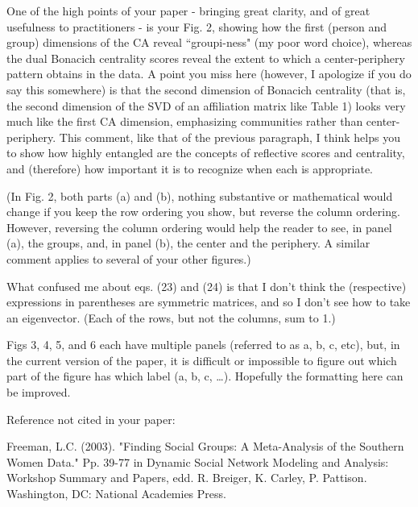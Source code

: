 \documentclass[]{letter}
\begin{document}
One of the high points of your paper - bringing great clarity, and of great usefulness to practitioners - is your Fig. 2, showing how the first (person and group) dimensions of the CA reveal ``groupi-ness" (my poor word choice), whereas the dual Bonacich centrality scores reveal the extent to which a center-periphery pattern obtains in the data. A point you miss here (however, I apologize if you do say this somewhere) is that the second dimension of Bonacich centrality (that is, the second dimension of the SVD of an affiliation matrix like Table 1) looks very much like the first CA dimension, emphasizing communities rather than center-periphery. This comment, like that of the previous paragraph, I think helps you to show how highly entangled are the concepts of reflective scores and centrality, and (therefore) how important it is to recognize when each is appropriate.

(In Fig. 2, both parts (a) and (b), nothing substantive or mathematical would change if you keep the row ordering you show, but reverse the column ordering. However, reversing the column ordering would help the reader to see, in panel (a), the groups, and, in panel (b), the center and the periphery. A similar comment applies to several of your other figures.)

What confused me about eqs. (23) and (24) is that I don't think the (respective) expressions in parentheses are symmetric matrices, and so I don't see how to take an eigenvector. (Each of the rows, but not the columns, sum to 1.)
    
Figs 3, 4, 5, and 6 each have multiple panels (referred to as a, b, c, etc), but, in the current version of the paper, it is difficult or impossible to figure out which part of the figure has which label (a, b, c, …). Hopefully the formatting here can be improved.

Reference not cited in your paper:

Freeman, L.C. (2003). "Finding Social Groups: A Meta-Analysis of the Southern Women Data." Pp. 39-77 in Dynamic Social Network Modeling and Analysis: Workshop Summary and Papers, edd. R. Breiger, K. Carley, P. Pattison. Washington, DC: National Academies Press.
\end{document}
